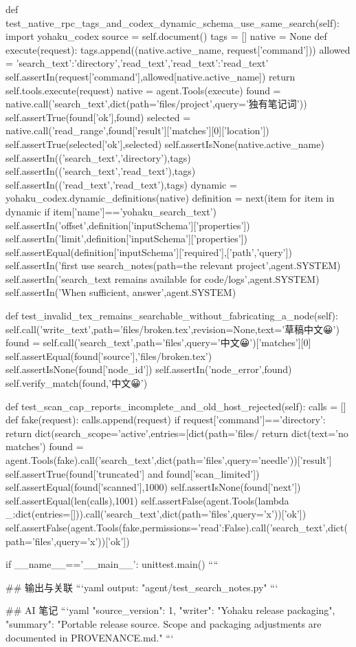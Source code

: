     def test_native_rpc_tags_and_codex_dynamic_schema_use_same_search(self):
        import yohaku_codex
        source = self.document()
        tags = []
        native = None
        def execute(request):
            tags.append((native.active_name, request['command']))
            allowed = {'search_text':{'directory','read_text'},'read_text':{'read_text'}}
            self.assertIn(request['command'],allowed[native.active_name])
            return self.tools.execute(request)
        native = agent.Tools(execute)
        found = native.call('search_text',dict(path='files/project',query='独有笔记词'))
        self.assertTrue(found['ok'],found)
        selected = native.call('read_range',found['result']['matches'][0]['location'])
        self.assertTrue(selected['ok'],selected)
        self.assertIsNone(native.active_name)
        self.assertIn(('search_text','directory'),tags)
        self.assertIn(('search_text','read_text'),tags)
        self.assertIn(('read_text','read_text'),tags)
        dynamic = yohaku_codex.dynamic_definitions(native)
        definition = next(item for item in dynamic if item['name']=='yohaku_search_text')
        self.assertIn('offset',definition['inputSchema']['properties'])
        self.assertIn('limit',definition['inputSchema']['properties'])
        self.assertEqual(definition['inputSchema']['required'],['path','query'])
        self.assertIn('first use search_notes(path=the relevant project',agent.SYSTEM)
        self.assertIn('search_text remains available for code/logs',agent.SYSTEM)
        self.assertIn('When sufficient, answer',agent.SYSTEM)

    def test_invalid_tex_remains_searchable_without_fabricating_a_node(self):
        self.call('write_text',path='files/broken.tex',revision=None,text='草稿中文😀\n')
        found = self.call('search_text',path='files',query='中文😀')['matches'][0]
        self.assertEqual(found['source'],'files/broken.tex')
        self.assertIsNone(found['node_id'])
        self.assertIn('node_error',found)
        self.verify_match(found,'中文😀')

    def test_scan_cap_reports_incomplete_and_old_host_rejected(self):
        calls = []
        def fake(request):
            calls.append(request)
            if request['command']=='directory':
                return dict(search_scope='active',entries=[dict(path='files/%
            return dict(text='no matches')
        found = agent.Tools(fake).call('search_text',dict(path='files',query='needle'))['result']
        self.assertTrue(found['truncated'] and found['scan_limited'])
        self.assertEqual(found['scanned'],1000)
        self.assertIsNone(found['next'])
        self.assertEqual(len(calls),1001)
        self.assertFalse(agent.Tools(lambda _:dict(entries=[])).call('search_text',dict(path='files',query='x'))['ok'])
        self.assertFalse(agent.Tools(fake,permissions={'read':False}).call('search_text',dict(path='files',query='x'))['ok'])


if __name__=='__main__':
    unittest.main()
````

## 输出与关联
```yaml
output: "agent/test_search_notes.py"
```

## AI 笔记
```yaml
{"source_version": 1, "writer": "Yohaku release packaging", "summary": "Portable release source. Scope and packaging adjustments are documented in PROVENANCE.md."}
```
